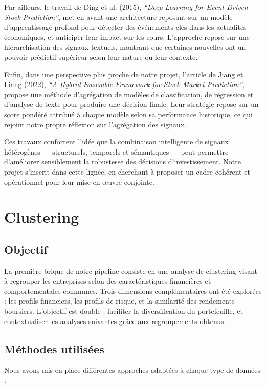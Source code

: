 \documentclass[a4paper,12pt]{article}
\begin{document}
Par ailleurs, le travail de Ding et al. (2015), \textit{“Deep Learning for Event-Driven Stock Prediction”}, met en avant une architecture reposant sur un modèle d’apprentissage profond pour détecter des événements clés dans les actualités économiques, et anticiper leur impact sur les cours. L’approche repose sur une hiérarchisation des signaux textuels, montrant que certaines nouvelles ont un pouvoir prédictif supérieur selon leur nature ou leur contexte.

Enfin, dans une perspective plus proche de notre projet, l’article de Jiang et Liang (2022), \textit{“A Hybrid Ensemble Framework for Stock Market Prediction”}, propose une méthode d’agrégation de modèles de classification, de régression et d’analyse de texte pour produire une décision finale. Leur stratégie repose sur un score pondéré attribué à chaque modèle selon sa performance historique, ce qui rejoint notre propre réflexion sur l’agrégation des signaux.

Ces travaux confortent l’idée que la combinaison intelligente de signaux hétérogènes — structurels, temporels et sémantiques — peut permettre d'améliorer sensiblement la robustesse des décisions d’investissement. Notre projet s’inscrit dans cette lignée, en cherchant à proposer un cadre cohérent et opérationnel pour leur mise en œuvre conjointe.

\section{Clustering}

\subsection*{Objectif}

La première brique de notre pipeline consiste en une analyse de clustering visant à regrouper les entreprises selon des caractéristiques financières et comportementales communes. Trois dimensions complémentaires ont été explorées : les profils financiers, les profils de risque, et la similarité des rendements boursiers. L'objectif est double : faciliter la diversification du portefeuille, et contextualiser les analyses suivantes grâce aux regroupements obtenus.

\subsection*{Méthodes utilisées}

Nous avons mis en place différentes approches adaptées à chaque type de données :
\end{document}
